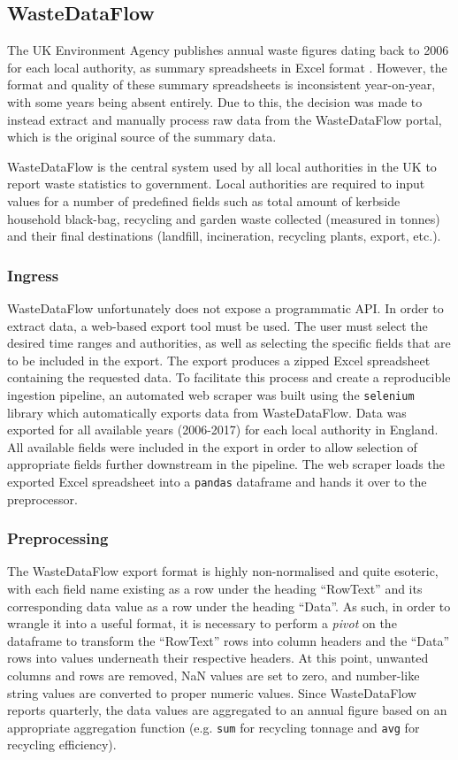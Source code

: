 \documentclass[11pt,conference]{IEEEtran}
\begin{document}
\subsection{WasteDataFlow}
The UK Environment Agency publishes annual waste figures dating back to 2006 for each local authority, as summary spreadsheets in Excel format \cite{UKGovernment2018}. However, the format and quality of these summary spreadsheets is inconsistent year-on-year, with some years being absent entirely. Due to this, the decision was made to instead extract and manually process raw data from the WasteDataFlow portal, which is the original source of the summary data. 

WasteDataFlow \cite{WasteDataFlow} is the central system used by all local authorities in the UK to report waste statistics to government. Local authorities are required to input values for a number of predefined fields such as total amount of kerbside household black-bag, recycling and garden waste collected (measured in tonnes) and their final destinations (landfill, incineration, recycling plants, export, etc.).
\subsubsection{Ingress}
WasteDataFlow unfortunately does not expose a programmatic API. In order to extract data, a web-based export tool must be used. The user must select the desired time ranges and authorities, as well as selecting the specific fields that are to be included in the export. The export produces a zipped Excel spreadsheet containing the requested data. To facilitate this process and create a reproducible ingestion pipeline, an automated web scraper was built using the \texttt{selenium} library which automatically exports data from WasteDataFlow. Data was exported for all available years (2006-2017) for each local authority in England. All available fields were included in the export in order to allow selection of appropriate fields further downstream in the pipeline. The web scraper loads the exported Excel spreadsheet into a \texttt{pandas} dataframe and hands it over to the preprocessor.
\subsubsection{Preprocessing}
The WasteDataFlow export format is highly non-normalised and quite esoteric, with each field name existing as a row under the heading “RowText” and its corresponding data value as a row under the heading “Data”. As such, in order to wrangle it into a useful format, it is necessary to perform a \textit{pivot} on the dataframe to transform the “RowText” rows into column headers and the “Data” rows into values underneath their respective headers. At this point, unwanted columns and rows are removed, NaN values are set to zero, and number-like string values are converted to proper numeric values. Since WasteDataFlow reports quarterly, the data values are aggregated to an annual figure based on an appropriate aggregation function (e.g. \texttt{sum} for recycling tonnage and \texttt{avg} for recycling efficiency).
\end{document}
